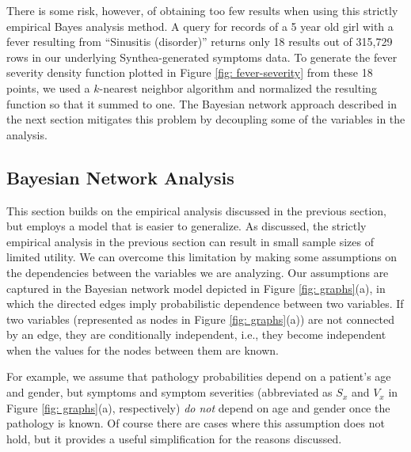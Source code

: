 \documentclass[11pt]{article}
\begin{document}
There is some risk, however, of obtaining too few results when using this strictly empirical Bayes analysis method.  A query for records of a 5 year old girl with a fever resulting from ``Sinusitis (disorder)'' returns only 18 results out of 315,729 rows in our underlying Synthea-generated symptoms data.  To generate the fever severity density function plotted in Figure \ref{fig: fever-severity} from these 18 points, we used a $k$-nearest neighbor algorithm and normalized the resulting function so that it summed to one. The Bayesian network approach described in the next section mitigates this problem by decoupling some of the variables in the analysis.  



\subsection{Bayesian Network Analysis}

This section builds on the empirical analysis discussed in the previous section, but employs a model that is easier to generalize.  As discussed, the strictly empirical analysis in the previous section can result in small sample sizes of limited utility.  We can overcome this limitation by making some assumptions on the dependencies between the variables we are analyzing.  Our assumptions are captured in the Bayesian network \citep[pp. 360--383]{bishop2013pattern} model depicted in Figure \ref{fig: graphs}(a), in which the directed edges imply probabilistic dependence between two variables.  If two variables (represented as nodes in Figure \ref{fig: graphs}(a)) are not connected by an edge, they are conditionally independent, i.e., they become independent when the values for the nodes between them are known.  

For example, we assume that pathology probabilities depend on a patient's age and gender, but symptoms and symptom severities (abbreviated as $S_{x}$ and $V_{x}$ in Figure \ref{fig: graphs}(a), respectively) \emph{do not} depend on age and gender once the pathology is known.  Of course there are cases where this assumption does not hold, but it provides a useful simplification for the reasons discussed.
\end{document}
